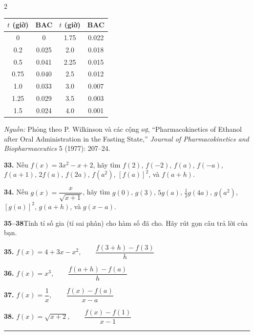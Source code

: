 \begin{multicols}{2}
\begin{center}
\setlength{\tabcolsep}{5pt}
\begin{tabular}{|c|c||c|c|}
\hline
\rowcolor{stewartcyan!15} $t$ (giờ) & BAC & $t$ (giờ) & BAC \\ \hline
0 & 0 & 1.75 & 0.022 \\
0.2 & 0.025 & 2.0 & 0.018 \\
0.5 & 0.041 & 2.25 & 0.015 \\
0.75 & 0.040 & 2.5 & 0.012 \\
1.0 & 0.033 & 3.0 & 0.007 \\
1.25 & 0.029 & 3.5 & 0.003 \\
1.5 & 0.024 & 4.0 & 0.001 \\ \hline
\end{tabular}
\end{center}
\vspace{-0.1cm}
{\scriptsize \textit{Nguồn:} Phỏng theo P. Wilkinson và các cộng sự, ``Pharmacokinetics of Ethanol after Oral Administration in the Fasting State,'' \textit{Journal of Pharmacokinetics and Biopharmaceutics} 5 (1977): 207--24.}

\vspace{0.25cm}
\noindent
\textbf{33.} Nếu $f(x) = 3x^2 - x + 2$, hãy tìm $f(2)$, $f(-2)$, $f(a)$, $f(-a)$, $f(a + 1)$, $2f(a)$, $f(2a)$, $f(a^2)$, $[f(a)]^2$, và $f(a + h)$.

\vspace{0.2cm}
\noindent
\textbf{34.} Nếu $g(x) = \dfrac{x}{\sqrt{x + 1}}$, hãy tìm $g(0)$, $g(3)$, $5g(a)$, $\frac{1}{2}g(4a)$, $g(a^2)$, $[g(a)]^2$, $g(a + h)$, và $g(x - a)$.

\vspace{0.3cm}
\noindent
{\color{stewartcyan}\textbf{35--38}}\quad Tính tỉ số gia (tỉ sai phân) cho hàm số đã cho. Hãy rút gọn câu trả lời của bạn.

\vspace{0.15cm}
\noindent
\textbf{35.} $f(x) = 4 + 3x - x^2, \qquad \dfrac{f(3 + h) - f(3)}{h}$

\vspace{0.15cm}
\noindent
\textbf{36.} $f(x) = x^3, \qquad \dfrac{f(a + h) - f(a)}{h}$

\vspace{0.15cm}
\noindent
\textbf{37.} $f(x) = \dfrac{1}{x}, \qquad \dfrac{f(x) - f(a)}{x - a}$

\vspace{0.15cm}
\noindent
\textbf{38.} $f(x) = \sqrt{x + 2}, \qquad \dfrac{f(x) - f(1)}{x - 1}$

\vspace{0.2cm}
\noindent
{\color{stewartcyan}\rule{\linewidth}{1.2pt}}

\end{multicols}